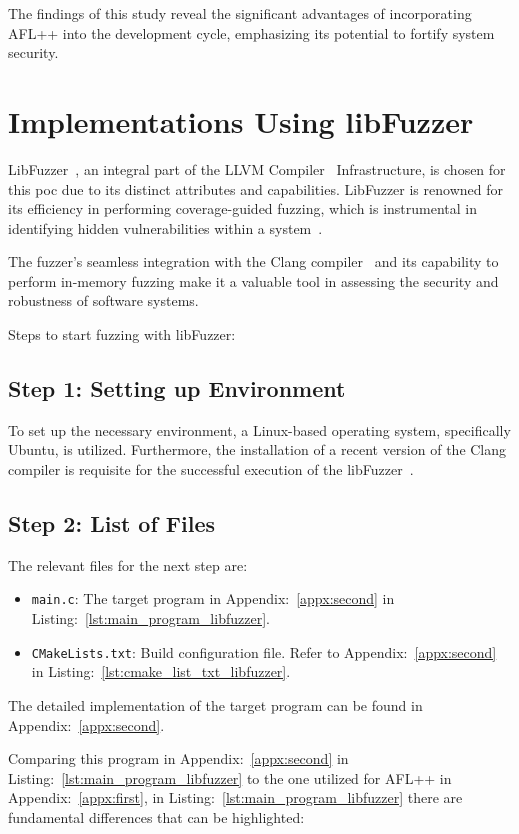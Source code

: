 The findings of this study reveal the
significant advantages of incorporating AFL++ into the development cycle,
emphasizing its potential to fortify system security.

\section{Implementations Using libFuzzer}
LibFuzzer~\cite{libFuzze17:online}, an integral part of the LLVM Compiler~\cite{libFuzze42:online} Infrastructure,
is chosen for this \acrlong{poc} due to its distinct attributes and capabilities.
LibFuzzer is renowned for its efficiency in performing coverage-guided fuzzing,
which is instrumental in identifying hidden vulnerabilities within a system~\cite{fuzzingt51:online}.

The fuzzer's seamless integration with the Clang compiler~\cite{ClangCLa81:online} and its capability
to perform in-memory fuzzing make it a valuable tool in assessing the security
and robustness of software systems.

Steps to start fuzzing with libFuzzer:

\subsection*{Step 1: Setting up Environment}
To set up the necessary environment, a Linux-based operating system,
specifically Ubuntu, is utilized. Furthermore, the installation of a recent
version of the Clang compiler is requisite for the successful execution of the
libFuzzer~\cite{ClangCLa81:online}.

\subsection*{Step 2: List of Files}
The relevant files for the next step are:
\begin{itemize}
    \item \texttt{main.c}: The target program
    in Appendix:~\ref{appx:second} in
    Listing:~\ref{lst:main_program_libfuzzer}.
    \item \texttt{CMakeLists.txt}: Build configuration file.
    Refer to Appendix:~\ref{appx:second} in
    Listing:~\ref{lst:cmake_list_txt_libfuzzer}.
\end{itemize}

The detailed implementation of the target program can be
found in Appendix:~\ref{appx:second}.

Comparing this program in Appendix:~\ref{appx:second} in
Listing:~\ref{lst:main_program_libfuzzer} to the one utilized for
AFL++ in Appendix:~\ref{appx:first}, in
Listing:~\ref{lst:main_program_libfuzzer} there are fundamental differences that
can be highlighted:


